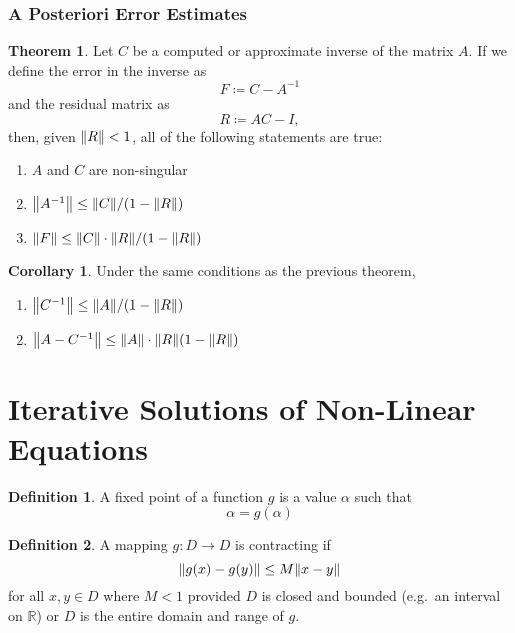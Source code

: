 \documentclass[11pt,letterpaper]{article}
\numberwithin{figure}{section} %
\newcommand{\Reals}{\mathbb{R}}
\newcommand{\inv}[1]{#1^{-1}}
\newcommand{\keyword}[1]{\colorbox{cyan!20!}{#1}}
\theoremstyle{definition}
\newtheorem{theorem}{Theorem}[subsection]
\theoremstyle{definition}
\theoremstyle{definition}
\newtheorem{definition}{Definition}[subsection]
\theoremstyle{definition}
\newtheorem*{corollary}{Corollary}
\theoremstyle{remark}
\theoremstyle{remark}
\theoremstyle{definition}
\theoremstyle{remark}
\theoremstyle{remark}
\begin{document}
\begin{multicols*}{3}
\subsubsection{A Posteriori Error Estimates}
\begin{theorem}
	Let $C$ be a computed or approximate inverse of the matrix $A$. If we define
	the error in the inverse as
	\[
		F \coloneqq C - \inv{A}
	\]
	and the \keyword{residual matrix} as
	\[
		R \coloneqq AC - I,
	\]
	then, given $\norm{R}	< 1$, all of the following statements are true:
	\begin{enumerate}[label={(\alph*)}]
	\item $A$ and $C$ are non-singular
	\item $\norm{\inv{A}} \leq \norm{C} / (1 - \norm{R})$
	\item $\norm{F} \leq \norm{C} \cdot \norm{R}/(1 - \norm{R})$
	\end{enumerate}
\end{theorem}
\begin{corollary}
	Under the same conditions as the previous theorem, 
	\begin{enumerate}[label={(\alph*)}, start=4]
		\item $\norm{\inv{C}} \leq \norm{A} / (1 - \norm{R})$
		\item $\norm{A - \inv{C}} \leq \norm{A} \cdot \norm{R}(1 - \norm{R})$
	\end{enumerate}
\end{corollary}
\section{Iterative Solutions of Non-Linear Equations}
\begin{definition}
	A \keyword{fixed point} of a function $g$ is a value $\alpha$ such that
	\[
		\alpha = g(\alpha)
	\]
\end{definition}
\begin{definition}
	A mapping $g: D \to D$ is \keyword{contracting} if
	\[
		\norm{g(x) - g(y)} \leq M \norm{x - y}	
	\]
	for all $x, y \in D$ where $M < 1$ provided $D$ is closed and bounded (e.g.\
	an interval on $\Reals$) or $D$ is the entire domain and range of $g$.
\end{definition}

\end{multicols*}
\end{document}
